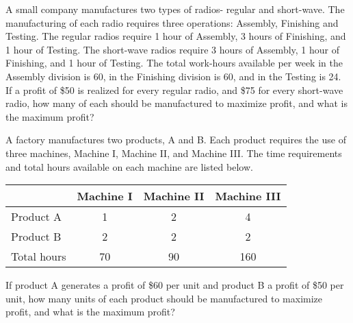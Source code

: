 \begin{puzzle}
    A small company manufactures two types of radios- regular and short-wave. The manufacturing of
    each radio requires three operations: Assembly, Finishing and Testing. The regular radios require
    1 hour of Assembly, 3 hours of Finishing, and 1 hour of Testing. The short-wave radios require 3
    hours of Assembly, 1 hour of Finishing, and 1 hour of Testing. The total work-hours available per
    week in the Assembly division is 60, in the Finishing division is 60, and in the Testing is 24. If a
    profit of \$50 is realized for every regular radio, and \$75 for every short-wave radio, how many of
    each should be manufactured to maximize profit, and what is the maximum profit?
\end{puzzle}

\begin{puzzle}
    A factory manufactures two products, A and B. Each product requires the use of three machines, Machine I, Machine II, and Machine III. The time requirements and total hours available on each machine are listed below.
    \begin{center}
        \begin{tabular}{|l|c|c|c|}
            \hline
                        & Machine I & Machine II & Machine III \\
            \hline
            Product A   & 1         & 2          & 4           \\
            \hline
            Product B   & 2         & 2          & 2           \\
            \hline
            Total hours & 70        & 90         & 160         \\
            \hline
        \end{tabular}
    \end{center}
    If product A generates a profit of \$60 per unit and product B a profit of \$50 per unit, how many units of each product should be manufactured to maximize profit, and what is the maximum profit?
\end{puzzle}

